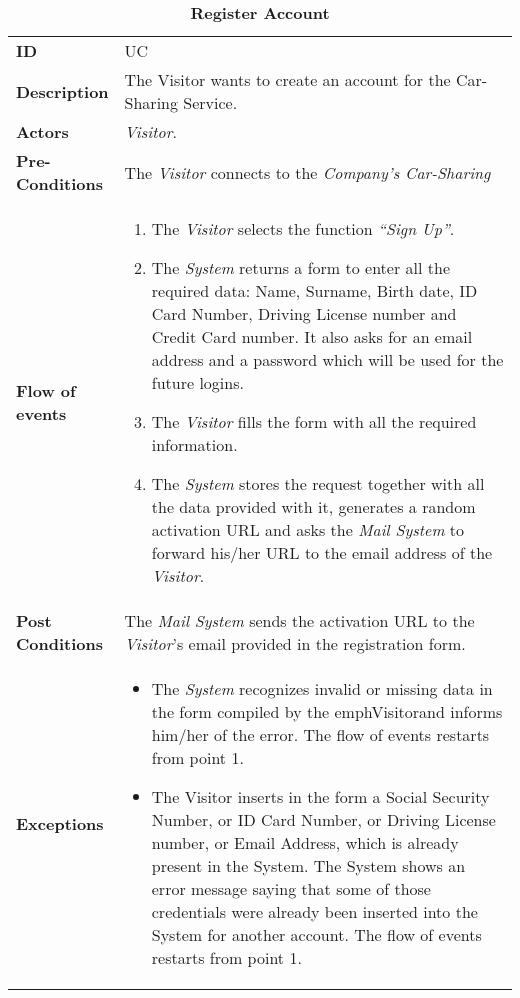 

\begin{longtable}{|p{0.2\linewidth} p{0.8\linewidth}|}
	\captionsetup{labelformat=empty} %
	\caption{\textbf{Register Account}} %
	\label{UC_Register}%
	\\ \hline %
	
	\textbf{ID} & UC\theUseCaseIdCounter \\ \hline
	\textbf{Description} & The Visitor wants to create an account for the Car-Sharing Service. \\ \hline
	\textbf{Actors} & \emph{Visitor}.\\ \hline
	\textbf{Pre-Conditions} & The \emph{Visitor} connects to the \emph{Company's Car-Sharing}} WebSite/Application. \\ \hline
	\textbf{Flow of events} & 
		\begin{enumerate}
			\item The \emph{Visitor} selects the function \textit{\textquotedblleft{Sign Up}\textquotedblright}.
			\item The \emph{System} returns a form to enter all the required data: Name, Surname, Birth date, ID Card Number, Driving License number and Credit Card number. It also asks for an email address and a password which will be used for the future logins.
			\item The \emph{Visitor} fills the form with all the required information.
			\item The \emph{System} stores the request together with all the data provided with it, generates a random activation URL and asks the \emph{Mail System} to forward his/her URL to the email address of the \emph{Visitor}.
		\end{enumerate}	 \\ \hline
	\textbf{Post Conditions} & The \emph{Mail System} sends the activation URL to the \emph{Visitor}'s email provided in the registration form. \\ \hline
	\textbf{Exceptions} & 
		\begin{itemize}
		\item The \emph{System} recognizes invalid or missing data in the form compiled by the emph{Visitor}and informs him/her of the error. The flow of events restarts from point 1.
		\item The Visitor inserts in the form a Social Security Number, or ID Card Number, or Driving License number, or Email Address, which is already present in the System. The System shows an error message saying that some of those credentials were already been inserted into the System for another account. The flow of events restarts from point 1.
		\end{itemize} \\ \hline
\end{longtable}



